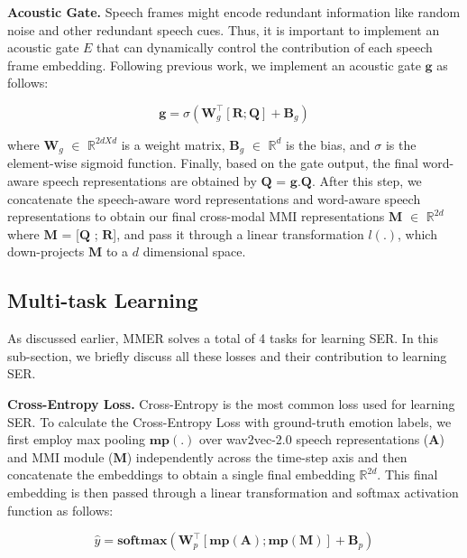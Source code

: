 \documentclass{INTERSPEECH2023}
\begin{document}
{\noindent \textbf{Acoustic Gate.}} Speech frames might encode redundant information like random noise and other redundant speech cues. Thus, it is important to implement an acoustic gate $E$ that can dynamically control the contribution of each speech frame embedding. Following previous work, we implement an acoustic gate $\mathbf{g}$ as follows:

\begin{equation}
\mathbf{g}=\sigma\left(\mathbf{W}_{g}^{\top}[ \mathbf{R} ; \mathbf{Q}] + \mathbf{B}_{g}\right)
\end{equation}

where $\mathbf{W}_{g}$ $\in$ $\mathbb{R}^{2dXd}$ is a weight matrix, $\mathbf{B}_{g}$ $\in$ $\mathbb{R}^{d}$ is the bias, and $\sigma$ is the element-wise sigmoid function. Finally, based on the gate output, the final word-aware speech representations are obtained by $\mathbf{Q}$ = $\mathbf{g} . \mathbf{Q}$. After this step, we concatenate the speech-aware word representations and word-aware speech representations to obtain our final cross-modal MMI representations $\mathbf{M}$ $\in$ $\mathbb{R}^{2d}$ where $\mathbf{M}$ = [$\mathbf{Q}$ ; $\mathbf{R}$], and pass it through a linear transformation $l(.)$, which down-projects $\mathbf{M}$ to a $d$ dimensional space.

\subsection{Multi-task Learning}
As discussed earlier, MMER solves a total of 4 tasks for learning SER. In this sub-section, we briefly discuss all these losses and their contribution to learning SER.
\vspace{0.5mm}

{\noindent \textbf{Cross-Entropy Loss.}} Cross-Entropy is the most common loss used for learning SER. To calculate the Cross-Entropy Loss with ground-truth emotion labels, we first employ max pooling $\mathbf{mp(.)}$ over wav2vec-2.0 speech representations ($\mathbf{A}$) and MMI module ($\mathbf{M}$) independently across the time-step axis and then concatenate the embeddings to obtain a single final embedding $\mathbb{R}^{2d}$.  This final embedding is then passed through a linear transformation and softmax activation function as follows:

\begin{equation}
\label{eqn:softmax}
\hat{y}=\mathbf{softmax}\left(\mathbf{W}_{p}^{\top}[ \mathbf{mp}(\mathbf{A}) ; \mathbf{mp}(\mathbf{M})] + \mathbf{B}_{p}\right)
\end{equation}
\end{document}
